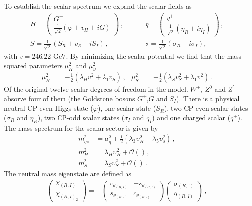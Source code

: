 \documentclass[12pt]{article}
\begin{document}
To establish the scalar spectrum we expand the scalar fields as
%
\begin{align*}
  H = \begin{pmatrix}G^+ \\ \frac{1}{\sqrt{2}} (\varphi+v_H+iG) \end{pmatrix} \,,&\hspace{1cm}
  \eta = \begin{pmatrix}\eta^{+} \\ \frac{1}{\sqrt{2}}(\eta_R+i\eta_I) \end{pmatrix} \,,\\
  S = \frac{1}{\sqrt{2}} (S_R+v_{S}+iS_I)\,,&\hspace{1cm}\sigma = \frac{1}{\sqrt{2}} (\sigma_R+i\sigma_I),
\end{align*}
%
with $v= 246.22$ GeV.  
By minimizing the scalar potential we find that the mass-squared parameters $\mu_H^2$ and $\mu_S^2$
%
\begin{align*}
    \mu^{2}_{H} =& -\frac{1}{2}\left( \lambda_{H}  v^2 + \lambda_{1}  v_S\right)\,,  &
    \mu^{2}_{S} =& -\frac{1}{2}\left( \lambda_{S}  v^{2}_{S} + \lambda_{1}  v^2\right)\,.
\end{align*}
%
Of the original twelve scalar degrees of freedom in the model, $W^{\pm}$, $Z^{0}$ and $Z^{\prime}$ absorve four of them (the Goldstone bosons $G^{\pm}$,$G$ and $S_{I}$). There is a physical neutral CP-even Higgs state ($\varphi$), one scalar state ($S_{R}$), two CP-even scalar states ($\sigma_{R}$ and $\eta_{R}$), two CP-odd scalar states ($\sigma_{I}$ and $\eta_{I}$) and one charged scalar ($\eta^{\pm}$). The mass spectrum for the scalar sector is given by
\begin{align*}
    m_{\eta^{\pm}}^{2} &= \mu_{\eta}^{2} + \frac{1}{2} (\lambda_{3} \upsilon^{2}_{H} + \lambda_{5} \upsilon^{2}_{s} )\,, \\
    m_{H}^{2} &= \lambda_{H} \upsilon_{H}^{2} + \mathcal{O}()\,, \\
    m_{S}^{2} &= \lambda_{S} \upsilon_{S}^{2} + \mathcal{O}()\,.
\end{align*}
%
The neutral mass eigenstate are defined as
%
\begin{align*}
    \begin{pmatrix}\chi_{(R,I)_{1}} \\ \chi_{(R,I)_{2}} \end{pmatrix} =& \begin{pmatrix} c_{\theta_{(R,I)}} & -s_{\theta_{(R,I)}} \\ s_{\theta_{(R,I)}} & c_{\theta_{(R,I)}} \end{pmatrix} \begin{pmatrix}\sigma_{(R,I)} \\ \eta_{(R,I)} \end{pmatrix} \,,
\end{align*}
\end{document}
